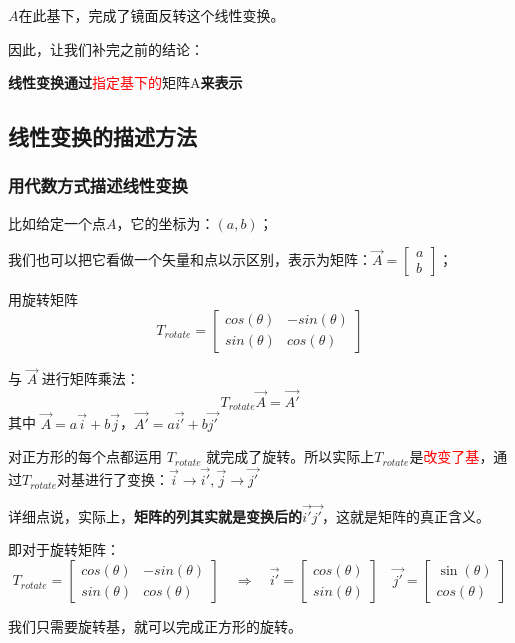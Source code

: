\documentclass[12pt]{article}
\begin{document}
$A$在此基下，完成了镜面反转这个线性变换。

因此，让我们补完之前的结论：
\begin{center}
\textbf{线性变换通过}\textcolor{red}{指定基下的}{矩阵}A\textbf{来表示}
\end{center}


\subsection{线性变换的描述方法}
\subsubsection{用代数方式描述线性变换}
比如给定一个点$A$，它的坐标为：$(a,b)$；

我们也可以把它看做一个矢量和点以示区别，表示为矩阵：$\vec{A} = \begin{bmatrix}a \\ b\end{bmatrix}$；

用旋转矩阵
$$
T_{rotate}=\begin{bmatrix}cos(\theta)&-sin(\theta)\\sin(\theta)&cos(\theta)\end{bmatrix}
$$

与 $\vec{A}$ 进行矩阵乘法：
$$
T_{rotate}\vec{A} = \vec{A'}
$$
其中 $\vec{A} = a\vec{i} + b\vec{j}$，$\vec{A'} = a\vec{i'} + b\vec{j'}$

对正方形的每个点都运用 $T_{rotate}$ 就完成了旋转。所以实际上$T_{rotate}$是\textcolor{red}{改变了基}，通过$T_{rotate}$对基进行了变换：$\vec{i} \rightarrow \vec{i'}, \vec{j} \rightarrow \vec{j'}$

详细点说，实际上，\textbf{矩阵的列其实就是变换后的$\vec{i'} \vec{j'}$}，这就是矩阵的真正含义。

即对于旋转矩阵：
$$
T_{rotate}=\begin{bmatrix}cos(\theta)&-sin(\theta)\\sin(\theta)&cos(\theta)\end{bmatrix} \quad \Rightarrow \quad 
\vec{i'} = \begin{bmatrix}
cos(\theta) \\ sin(\theta)\end{bmatrix} \quad \vec{j'} = \begin{bmatrix}
\sin(\theta) \\cos(\theta)\end{bmatrix}
$$

我们只需要旋转基，就可以完成正方形的旋转。
\end{document}
